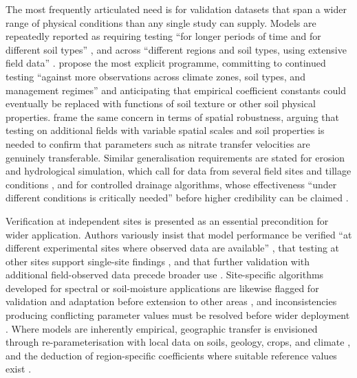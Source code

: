 The most frequently articulated need is for validation datasets that span a wider range of physical conditions than any single study can supply. Models are repeatedly reported as requiring testing ``for longer periods of time and for different soil types'' \parencite{Salazar2009}, and across ``different regions and soil types, using extensive field data'' \parencite{Li2026}. \textcite{Li2006} propose the most explicit programme, committing to continued testing ``against more observations across climate zones, soil types, and management regimes'' and anticipating that empirical coefficient constants could eventually be replaced with functions of soil texture or other soil physical properties. \textcite{Chelil2022} frame the same concern in terms of spatial robustness, arguing that testing on additional fields with variable spatial scales and soil properties is needed to confirm that parameters such as nitrate transfer velocities are genuinely transferable. Similar generalisation requirements are stated for erosion and hydrological simulation, which call for data from several field sites and tillage conditions \parencite{Turunen2020}, and for controlled drainage algorithms, whose effectiveness ``under different conditions is critically needed'' before higher credibility can be claimed \parencite{Negm2017}.

Verification at independent sites is presented as an essential precondition for wider application. Authors variously insist that model performance be verified ``at different experimental sites where observed data are available'' \parencite{Azevedo1997}, that testing at other sites support single-site findings \parencite{Qi2015}, and that further validation with additional field-observed data precede broader use \parencite{Kalita1998,Sadhukhan2019b}. Site-specific algorithms developed for spectral or soil-moisture applications are likewise flagged for validation and adaptation before extension to other areas \parencite{Rijal2013}, and inconsistencies producing conflicting parameter values must be resolved before wider deployment \parencite{Dar2022}. Where models are inherently empirical, geographic transfer is envisioned through re-parameterisation with local data on soils, geology, crops, and climate \parencite{Azevedo1997}, and the deduction of region-specific coefficients where suitable reference values exist \parencite{FathAllah2025}.

